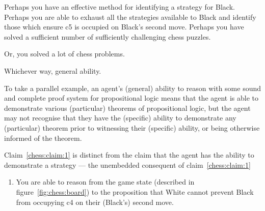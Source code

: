 \documentclass[10pt]{article}
\begin{document}
\begin{note}
  Perhaps you have an effective method for identifying a strategy for Black.
  Perhaps you are able to exhaust all the strategies available to Black and identify those which ensure c5 is occupied on Black's second move.
  Perhaps you have solved a sufficient number of sufficiently challenging chess puzzles.

  Or, you solved a lot of chess problems.

  Whichever way, general ability.
\end{note}

\begin{note}
  To take a parallel example, an agent's (general) ability to reason with some sound and complete proof system for propositional logic means that the agent is able to demonstrate various (particular) theorems of propositional logic, but the agent may not recognise that they have the (specific) ability to demonstrate any (particular) theorem prior to witnessing their (specific) ability, or being otherwise informed of the theorem.
\end{note}

\begin{note}
  Claim~\ref{chess:claim:1} is distinct from the claim that the agent has the ability to demonstrate a strategy --- the unembedded consequent of claim~\ref{chess:claim:1}
\begin{enumerate}
\item\label{chess:claim:2}\label{chess:claim:1:conditional} You are able to reason from the game state (described in figure~\ref{fig:chess:board}) to the proposition that White cannot prevent Black from occupying c4 on their (Black's) second move.
\end{enumerate}
\end{note}

\end{document}
